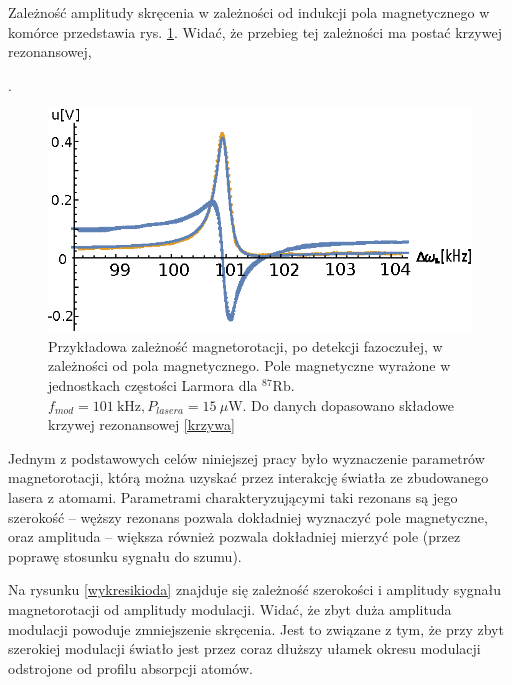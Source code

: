 \documentclass[a4paper,10pt,twoside]{report}
\begin{document}
 Zależność amplitudy skręcenia w zależności od indukcji pola magnetycznego w komórce przedstawia rys. \ref{fig:magnetorot1}. Widać, że przebieg tej zależności ma postać krzywej rezonansowej, .
\begin{figure}[h!]
\centering
 \includegraphics[width=\textwidth]{magnetorot1.eps}
 \caption{Przykładowa zależność magnetorotacji, po detekcji fazoczułej, w zależności od pola magnetycznego. Pole magnetyczne wyrażone w jednostkach częstości Larmora dla ${}^{87} \mathrm{Rb}$.
 $f_{mod}=101~\mathrm{kHz}, P_{lasera}=15~\mu$W. Do danych dopasowano składowe krzywej rezonansowej \ref{krzywa}}
 \label{fig:magnetorot1}
\end{figure}

Jednym z podstawowych celów niniejszej pracy było wyznaczenie parametrów magnetorotacji, którą można uzyskać przez interakcję światła ze zbudowanego lasera z atomami.
Parametrami charakteryzującymi taki rezonans są jego  szerokość -- węższy rezonans pozwala dokładniej wyznaczyć pole magnetyczne, oraz amplituda -- większa również pozwala dokładniej mierzyć pole (przez poprawę stosunku sygnału do szumu).

Na rysunku \ref{wykresikioda} znajduje się zależność szerokości i amplitudy sygnału magnetorotacji od amplitudy modulacji. Widać, że zbyt duża amplituda modulacji powoduje zmniejszenie skręcenia. Jest to związane z tym, że przy zbyt szerokiej modulacji światło jest przez coraz dłuższy ułamek okresu modulacji odstrojone od profilu absorpcji atomów. 
\end{document}

